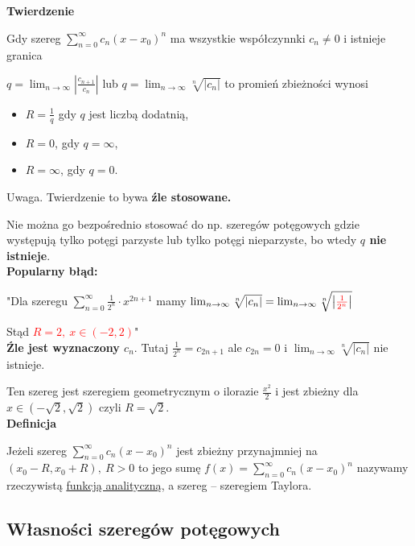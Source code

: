 \textbf{Twierdzenie}

Gdy szereg $ \sum\limits_{n = 0}^{\infty} c_n(x - x_0)^n $ ma wszystkie współczynnki $ c_n \neq 0 $ i istnieje granica

$ q = \lim_{n \to \infty} \left| \frac{c_{n + 1}}{c_n} \right| $ lub $ q = \lim_{n \to \infty} \sqrt[n]{|c_n|} $
to promień zbieżności wynosi 

\begin{itemize}
    \item $ R = \frac{1}{q} $ gdy $q$ jest liczbą dodatnią,
    \item $ R = 0$, gdy $q = \infty$,
    \item $ R = \infty $, gdy $ q = 0 $. \\
\end{itemize}

Uwaga. Twierdzenie to bywa \textbf{źle stosowane.}

Nie można go bezpośrednio stosować do np. szeregów potęgowych gdzie występują tylko potęgi parzyste lub tylko
potęgi nieparzyste, bo wtedy \textbf{$q$ nie istnieje}. \\

\textbf{Popularny błąd:}

"Dla szeregu $ \sum\limits_{n = 0}^{\infty} \frac{1}{2^n} \cdot x^{2n + 1} $ mamy 
$ \lim_{n \to \infty} \sqrt[n]{|c_n|} = \lim_{n \to \infty} \sqrt[n]{ \left| \textcolor{red}{\frac{1}{2^n}} \right| } $

Stąd \textcolor{red}{$ R = 2, \ x \in (-2, 2) $}" \\

\textbf{Źle jest wyznaczony $c_n$}. Tutaj $ \frac{1}{2^n} = c_{2n + 1} $ ale $ c_{2n} = 0 $ i
$ \lim_{n \to \infty} \sqrt[n]{|c_n|} $ nie istnieje.

Ten szereg jest szeregiem geometrycznym o ilorazie $ \frac{x^2}{2} $ i jest zbieżny dla $ x \in (-\sqrt{2}, \sqrt{2}) $
czyli $ R = \sqrt{2} $. \\

\textbf{Definicja}

Jeżeli szereg $ \sum\limits_{n = 0}^{\infty} c_n(x - x_0)^n $ jest zbieżny przynajmniej na $ (x_0 - R, x_0 + R), \ R > 0 $ to
jego sumę $ f(x) = \sum\limits_{n = 0}^{\infty} c_n(x - x_0)^n $ nazywamy rzeczywistą \underline{funkcją analityczną}, a szereg
-- szeregiem Taylora.


\subsection*{Własności szeregów potęgowych}

